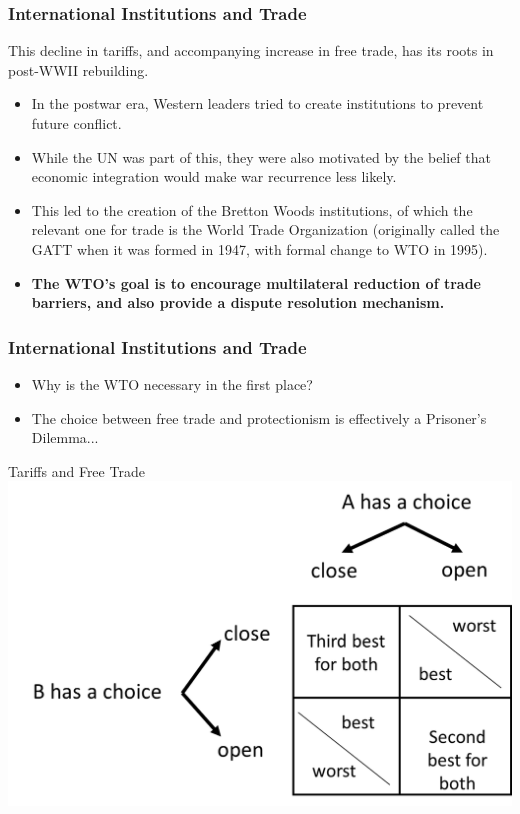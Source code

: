 \documentclass{beamer}
\begin{document}
\begin{frame} 
	\frametitle{\LARGE{International Institutions and Trade}}
This decline in tariffs, and accompanying increase in free trade, has its roots in post-WWII rebuilding.
	\begin{itemize}
		\item In the postwar era, Western leaders tried to create institutions to prevent future conflict. \pause
		\item While the UN was part of this, they were also motivated by the belief that economic integration would make war recurrence less likely. \pause
		\item This led to the creation of the Bretton Woods institutions, of which the relevant one for trade is the World Trade Organization (originally called the GATT when it was formed in 1947, with formal change to WTO in 1995). \pause
				\item \textbf{The WTO's goal is to encourage multilateral reduction of trade barriers, and also provide a dispute resolution mechanism.}
	\end{itemize}
\end{frame}

\begin{frame} 
	\frametitle{\LARGE{International Institutions and Trade}}
	\begin{itemize}
		\item Why is the WTO necessary in the first place? \pause
		\item The choice between free trade and protectionism is effectively a Prisoner's Dilemma...
	\end{itemize}
\end{frame}

\begin{frame}{\LARGE Tariffs and Free Trade}
	\centering
	\includegraphics[width=\textwidth,height=0.8\textheight,keepaspectratio]{freetradePD.png}
\end{frame}
\end{document}
